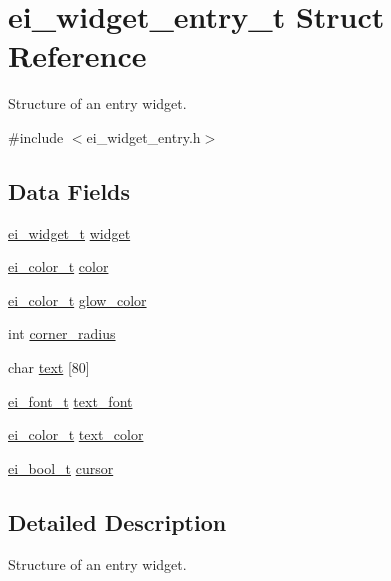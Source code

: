 \hypertarget{structei__widget__entry__t}{\section{ei\-\_\-widget\-\_\-entry\-\_\-t Struct Reference}
\label{structei__widget__entry__t}
}


Structure of an entry widget.  




{\ttfamily \#include $<$ei\-\_\-widget\-\_\-entry.\-h$>$}

\subsection*{Data Fields}
\begin{DoxyCompactItemize}
\item 
\hyperlink{structei__widget__t}{ei\-\_\-widget\-\_\-t} \hyperlink{structei__widget__entry__t_a95a2762218ed376c16e12494625e3769}{widget}
\item 
\hyperlink{structei__color__t}{ei\-\_\-color\-\_\-t} \hyperlink{structei__widget__entry__t_af15c8b96fc649a3d7ecc086465b73bc4}{color}
\item 
\hyperlink{structei__color__t}{ei\-\_\-color\-\_\-t} \hyperlink{structei__widget__entry__t_ad4f097b683099c4b17a912615d32927e}{glow\-\_\-color}
\item 
int \hyperlink{structei__widget__entry__t_a381053252ab90cc7ab377fc9cc1d326f}{corner\-\_\-radius}
\item 
char \hyperlink{structei__widget__entry__t_afc849da34ef6ada8535fcf4d1fdd5568}{text} \mbox{[}80\mbox{]}
\item 
\hyperlink{ei__types_8h_a22c8198e4d641e4bc67bb17f9c6bcda7}{ei\-\_\-font\-\_\-t} \hyperlink{structei__widget__entry__t_a19432e1eb2109cb7ccca0195d9e9fb60}{text\-\_\-font}
\item 
\hyperlink{structei__color__t}{ei\-\_\-color\-\_\-t} \hyperlink{structei__widget__entry__t_a1112dd956db86c5ea21184bf7e8d20ea}{text\-\_\-color}
\item 
\hyperlink{ei__types_8h_a383b9af13bd6a0a893096ead3c4d8e28}{ei\-\_\-bool\-\_\-t} \hyperlink{structei__widget__entry__t_a0b69f461f2108b3a90e8b521df7e6f1f}{cursor}
\end{DoxyCompactItemize}


\subsection{Detailed Description}
Structure of an entry widget. 

